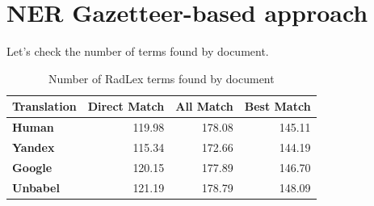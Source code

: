 \label{chap4}




\the\textwidth



\section{NER Gazetteer-based approach}

Let's check the number of terms found by document.


\begin{table}[ht]
\centering
\begin{tabular}{lrrr}
\toprule
\textbf{Translation}   &   \textbf{Direct Match} &   \textbf{All Match} &   \textbf{Best Match} \\
\midrule
 \textbf{Human}         &         119.98 &      178.08 &       145.11 \\
 
 \textbf{Yandex}        &         115.34 &      172.66 &       144.19 \\
 
 \textbf{Google}        &         120.15 &      177.89 &       146.70 \\
 
 \textbf{Unbabel}       &         121.19 &      178.79 &       148.09 \\
 
\bottomrule
\end{tabular} 
\caption{Number of RadLex terms found by document}
\label{table:terms_by_document}
\end{table}







